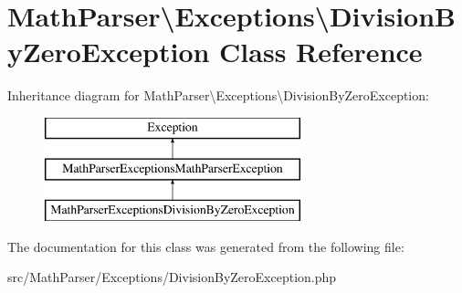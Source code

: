 \hypertarget{classMathParser_1_1Exceptions_1_1DivisionByZeroException}{\section{Math\-Parser\textbackslash{}Exceptions\textbackslash{}Division\-By\-Zero\-Exception Class Reference}
\label{classMathParser_1_1Exceptions_1_1DivisionByZeroException}
}
Inheritance diagram for Math\-Parser\textbackslash{}Exceptions\textbackslash{}Division\-By\-Zero\-Exception\-:\begin{figure}[H]
\begin{center}
\leavevmode
\includegraphics[height=3.000000cm]{classMathParser_1_1Exceptions_1_1DivisionByZeroException}
\end{center}
\end{figure}


The documentation for this class was generated from the following file\-:\begin{DoxyCompactItemize}
\item 
src/\-Math\-Parser/\-Exceptions/Division\-By\-Zero\-Exception.\-php\end{DoxyCompactItemize}
